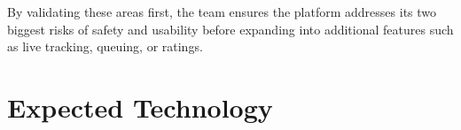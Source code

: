 \documentclass{article}
\begin{document}
By validating these areas first, the team ensures the platform addresses its two biggest risks of safety and usability before expanding into additional features such as live tracking, queuing, or ratings.


\section{Expected Technology}





\end{document}
